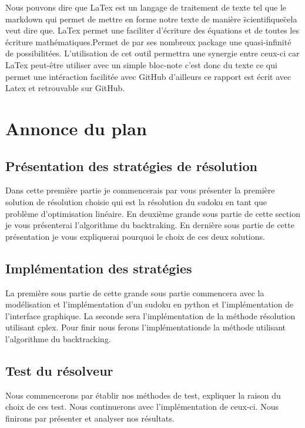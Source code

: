 Nous pouvons dire que LaTex est un langage de traitement de texte tel que le markdown qui permet de mettre en forme notre texte de manière \"scientifique\" cela veut dire que. LaTex permet une faciliter d'écriture des équations et de toutes les écriture mathématiques.Permet de par ses nombreux package une quasi-infinité de possibilitées.
L'utilisation de cet outil permettra une synergie entre ceux-ci car LaTex peut-être utiliser avec un simple bloc-note c'est donc du texte ce qui permet une intéraction facilitée avec GitHub d'ailleurs ce rapport est écrit avec Latex et retrouvable sur GitHub.\newline


\hypertarget{Annonce du plan}{%
\section{Annonce du plan}\label{annonce du plan}}

\subsection{Présentation des stratégies de résolution}

Dans cette première partie je commencerais par vous présenter la première solution de résolution choisie qui est la résolution du sudoku en tant que problème d'optimisation linéaire.\newline
En deuxième grande sous partie de cette section je vous présenterai l'algorithme du backtraking.\newline
En dernière sous partie de cette présentation je vous expliquerai pourquoi le choix de ces deux solutions.
\subsection{Implémentation des stratégies}
La première sous partie de cette grande sous partie commencera avec la modélisation et l'implémentation d'un sudoku en python et l'implémentation de l'interface graphique.\newline
La seconde sera l'implémentation de la méthode résolution utilisant cplex.\newline
Pour finir nous ferons l'implémentationde la méthode utilisant l'algorithme du backtracking.\newline
\subsection{Test du résolveur}
Nous commencerons par établir nos méthodes de test, expliquer la raison du choix de ces test.\newline
Nous continuerons avec l'implémentation de ceux-ci.\newline
Nous finirons par présenter et analyser nos résultats.\newline
